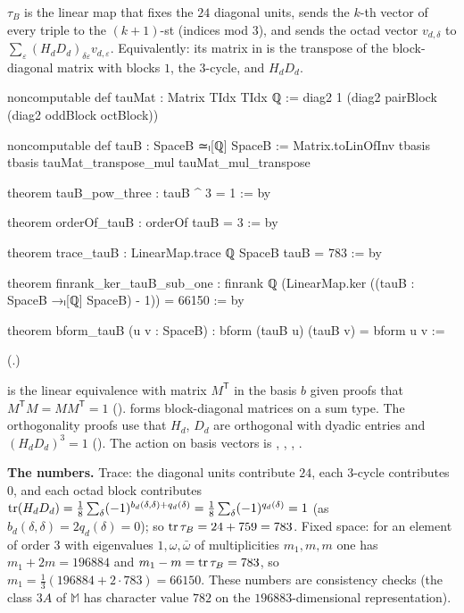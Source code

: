 \begin{definition}[$\tau_B$]\label{ch21:def:tauB}
$\tau_B$ is the linear map that fixes the $24$ diagonal units, sends the $k$-th vector of every triple to the
$(k+1)$-st (indices mod $3$), and sends the octad vector $v_{d,\delta}$ to
$\sum_\varepsilon(H_dD_d)_{\delta\varepsilon}v_{d,\varepsilon}$.  Equivalently: its matrix in  is the
transpose of the block-diagonal matrix  with blocks $1$, the $3$-cycle, and $H_dD_d$.
\end{definition}
\begin{leancode}
noncomputable def tauMat : Matrix TIdx TIdx ℚ :=
  diag2 1 (diag2 pairBlock (diag2 oddBlock octBlock))
\end{leancode}
\begin{leancode}
noncomputable def tauB : SpaceB ≃ₗ[ℚ] SpaceB :=
  Matrix.toLinOfInv tbasis tbasis tauMat_transpose_mul tauMat_mul_transpose
\end{leancode}
\begin{leancode}
theorem tauB_pow_three : tauB ^ 3 = 1 := by
\end{leancode}
\begin{leancode}
theorem orderOf_tauB : orderOf tauB = 3 := by
\end{leancode}
\begin{leancode}
theorem trace_tauB : LinearMap.trace ℚ SpaceB tauB = 783 := by
\end{leancode}
\begin{leancode}
theorem finrank_ker_tauB_sub_one :
    finrank ℚ (LinearMap.ker ((tauB : SpaceB →ₗ[ℚ] SpaceB) - 1)) = 66150 := by
\end{leancode}
\begin{leancode}
theorem bform_tauB (u v : SpaceB) : bform (tauB u) (tauB v) = bform u v :=
\end{leancode}
(.)
\begin{dictionary}
 is the linear equivalence with matrix $M^{\mathsf T}$ in the basis
$b$ given proofs that $M^{\mathsf T}M=MM^{\mathsf T}=1$ ().
 forms block-diagonal matrices on a sum type.  The orthogonality proofs use that $H_d$,
$D_d$ are orthogonal with dyadic entries and $(H_dD_d)^3=1$ ().
The action on basis vectors is , , , .

\textbf{The numbers.}  Trace: the diagonal units contribute $24$, each $3$-cycle contributes $0$, and
each octad block contributes $\operatorname{tr}(H_dD_d)=\tfrac18\sum_\delta(-1)^{b_d(\delta,\delta)+q_d(\delta)}=\tfrac18\sum_\delta(-1)^{q_d(\delta)}=1$
(as $b_d(\delta,\delta)=2q_d(\delta)=0$); so $\operatorname{tr}\tau_B=24+759=783$.  Fixed space: for an element of order $3$
with eigenvalues $1,\omega,\bar\omega$ of multiplicities $m_1,m,m$ one has $m_1+2m=196884$ and
$m_1-m=\operatorname{tr}\tau_B=783$, so $m_1=\tfrac13(196884+2\cdot783)=66150$.  These numbers are consistency checks
(the class $3A$ of $\mathbb M$ has character value $782$ on the $196883$-dimensional representation).
\end{dictionary}
